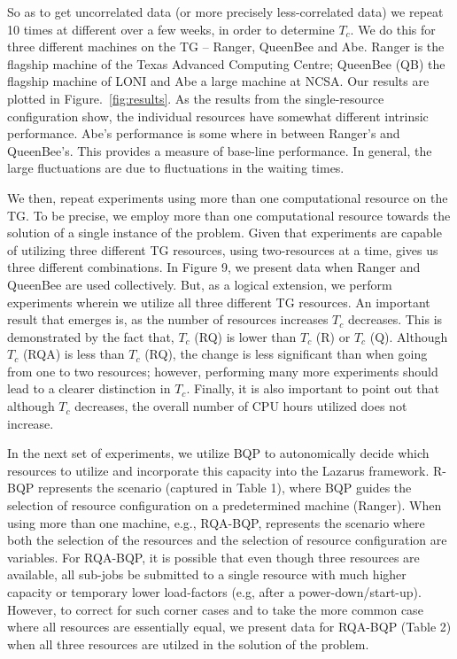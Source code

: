 \documentclass{sig-alternate}
\newcommand{\tc}{$T_c$ }
\newcommand{\tcnsp}{$T_c$}
\begin{document}
So as to get uncorrelated data (or more precisely less-correlated data) we repeat 10 times at different over a few weeks, in order to determine \tcnsp. We do this for three different machines on the TG -- Ranger, QueenBee and Abe.  Ranger is the flagship machine of the Texas Advanced Computing Centre; QueenBee (QB) the flagship machine of LONI and Abe a large machine at NCSA. Our results are plotted in Figure.~\ref{fig:results}.  As the results from the single-resource configuration show, the individual resources have somewhat different intrinsic performance.  Abe's performance is some where in between Ranger's and QueenBee's.  This provides a measure of base-line performance. In general, the large fluctuations are due to fluctuations in the waiting times.

We then, repeat experiments using more than one computational resource on the TG. To be precise, we employ more than one computational resource towards the solution of a single instance of the problem.  Given that experiments are capable of utilizing three different TG resources, using two-resources at a time, gives us three different combinations. In Figure 9, we present data when Ranger and QueenBee are used collectively.  But, as a logical extension, we perform experiments wherein we utilize all three different TG resources. An important result that emerges is,
as the number of resources increases \tc decreases. This is demonstrated by the fact that, \tc (RQ) is lower than \tc (R) or \tc (Q).  Although \tc (RQA) is less than \tc (RQ), the change is less significant than when going from one to two resources; however, performing many more experiments should lead to a clearer distinction in \tcnsp.
Finally, it is also important to point out that although \tc decreases, the overall number of CPU hours utilized does not increase. %

In the next set of experiments, we utilize BQP to autonomically decide which resources to utilize and incorporate this capacity into the Lazarus framework.  R-BQP represents the scenario (captured in Table 1), where BQP guides the selection of resource configuration on a predetermined machine (Ranger).  When using more than one machine, e.g., RQA-BQP, represents the scenario where both the selection of the resources and the selection of resource configuration are variables. For RQA-BQP, it is possible that even though three resources are available, all sub-jobs be submitted to a single resource with much higher capacity or temporary lower load-factors (e.g, after a power-down/start-up). However, to correct for such corner cases and to take the more common case where all resources are essentially equal, we present data for RQA-BQP (Table 2) when all three resources are utilzed in the solution of the problem.
\end{document}

